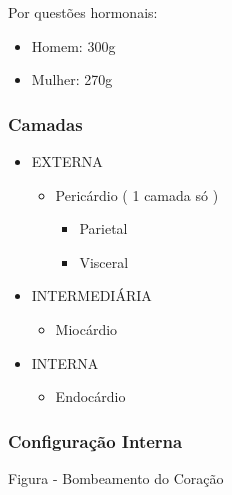 \documentclass[
]{book}
\providecommand{\tightlist}{%
  \setlength{\itemsep}{0pt}\setlength{\parskip}{0pt}}
\begin{document}
Por questões hormonais:

\begin{itemize}
\tightlist
\item
  Homem: 300g
\item
  Mulher: 270g
\end{itemize}

\hypertarget{camadas}{%
\subsubsection{Camadas}\label{camadas}}

\begin{itemize}
\tightlist
\item
  EXTERNA

  \begin{itemize}
  \tightlist
  \item
    Pericárdio ( 1 camada só )

    \begin{itemize}
    \tightlist
    \item
      Parietal
    \item
      Visceral
    \end{itemize}
  \end{itemize}
\item
  INTERMEDIÁRIA

  \begin{itemize}
  \tightlist
  \item
    Miocárdio
  \end{itemize}
\item
  INTERNA

  \begin{itemize}
  \tightlist
  \item
    Endocárdio
  \end{itemize}
\end{itemize}

\hypertarget{configurauxe7uxe3o-interna}{%
\subsubsection{Configuração Interna}\label{configurauxe7uxe3o-interna}}

Figura - Bombeamento do Coração
\end{document}
